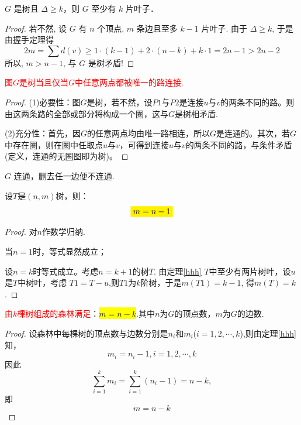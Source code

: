 \begin{example}
	$G$ 是树且 $\varDelta \geq k$，则 $G$ 至少有 $k$ 片叶子．
\end{example}
\begin{proof}
	若不然, 设 \( G \) 有 \( n \) 个顶点, \( m \) 条边且至多 \( k-1 \) 片叶子. 由于 \( \varDelta \geq k \), 于是由握手定理得
	\[
	2 m=\sum d(v) \geq 1 \cdot(k-1)+2 \cdot(n-k)+k \cdot 1=2 n-1>2 n-2
	\]
	所以, \( m>n-1 \), 与 \( G \) 是树矛盾!
\end{proof}

\begin{theorem}
	\label{kkkj}
	\textcolor{red}{图$G$是树当且仅当$G$中任意两点都被唯一的路连接.}
\end{theorem}
\begin{proof}
(1)必要性：图$G$是树，若不然，设$P1$与$P2$是连接$u$与$v$的两条不同的路。则由这两条路的全部或部分将构成一个圈，这与$G$是树相矛盾.

(2)充分性：首先，因$G$的任意两点均由唯一路相连，所以$G$是连通的。其次，若$G$中存在圈，则在圈中任取点$u$与$v$，可得到连接$u$与$v$的两条不同的路，与条件矛盾(定义，连通的无圈图即为树)。
\end{proof}
\begin{note}
$G$ 连通，删去任一边便不连通.
\end{note}



\begin{theorem}
设$T$是$(n, m)$树，则：
\[
\colorbox{yellow}{$ m=n-1$}
\]
\end{theorem}
\begin{proof}
对$n$作数学归纳.

当$n=1$时，等式显然成立；

设$n=k$时等式成立。考虑$n=k+1$的树$T$.
由定理\ref{hhh} $T$中至少有两片树叶，设$u$是$T$中树叶，考虑
$T1=T-u$,则$T1$为$k$阶树，于是$m(T1)=k-1$, 得$m(T)=k$.
\end{proof}


\begin{corollary}
\textcolor{red}{由$k$棵树组成的森林满足}：\colorbox{yellow}{$m=n-k$}.其中$n$为$G$的顶点数，$m$为$G$的边数.
\end{corollary}
\begin{proof}
设森林中每棵树的顶点数与边数分别是$n_i$和$m_i$($i=1,2,\cdots, k$),则由定理\ref{hhh}知，
\[
m_i = n_i -1, i = 1,2,\cdots, k
\]
因此
\[
\sum\limits_{i=1}^{k}m_i=\sum\limits_{i=1}^{k}(n_i -1)=n-k,
\]
即\[
m=n-k
\]
\end{proof}

